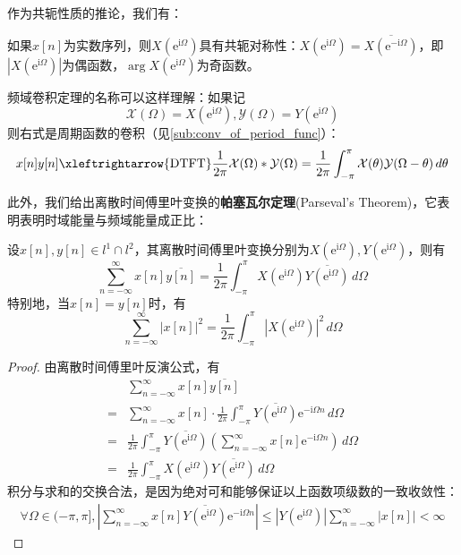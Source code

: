 作为共轭性质的推论，我们有：
\begin{corollary}
    如果$x[n]$为实数序列，则$X(\mathrm{e}^{\mathrm{i}\Omega})$具有共轭对称性：$X(\mathrm{e}^{\mathrm{i}\Omega})=\overline{X\left(\mathrm{e}^{-\mathrm{i}\Omega}\right)}$，即$|X(\mathrm{e}^{\mathrm{i}\Omega})|$为偶函数，$\arg X(\mathrm{e}^{\mathrm{i}\Omega})$为奇函数。
\end{corollary}

频域卷积定理的名称可以这样理解：如果记
$$\mathcal{X} (\Omega)=X(\mathrm{e}^{\mathrm{i}\Omega}),\mathcal{Y} (\Omega)=Y(\mathrm{e}^{\mathrm{i}\Omega})$$
则右式是周期函数的卷积（见\ref{sub:conv_of_period_func}）：
\[x[n]y[n]\xleftrightarrow{\text{DTFT}}\frac{1}{2\pi}\mathcal{X} (\Omega)*\mathcal{Y} (\Omega)=\frac{1}{2\pi}\int_{-\pi}^{\pi}\mathcal{X} (\theta)\mathcal{Y} (\Omega-\theta)\,d\theta\]

此外，我们给出离散时间傅里叶变换的\textbf{帕塞瓦尔定理}(Parseval's Theorem)，它表明表明时域能量与频域能量成正比：
\begin{theorem}[离散时间傅里叶变换的帕塞瓦尔定理]
    设$x[n],y[n]\in l^1\cap l^2$，其离散时间傅里叶变换分别为$X(\mathrm{e}^{\mathrm{i}\Omega}),Y(\mathrm{e}^{\mathrm{i}\Omega})$，则有
    \[\sum_{n=-\infty}^{\infty}x[n]\overline{y[n]}=\frac{1}{2\pi}\int_{-\pi}^{\pi}X(\mathrm{e}^{\mathrm{i}\Omega})\overline{Y(\mathrm{e}^{\mathrm{i}\Omega})}\,d\Omega\]
    特别地，当$x[n]=y[n]$时，有
    \[\sum_{n=-\infty}^{\infty}|x[n]|^2=\frac{1}{2\pi}\int_{-\pi}^{\pi}|X(\mathrm{e}^{\mathrm{i}\Omega})|^2\,d\Omega\]
\end{theorem}
\begin{proof}
    由离散时间傅里叶反演公式，有
    \begin{align*}
        &\sum_{n=-\infty}^{\infty}x[n]\overline{y[n]}\\
        =&\sum_{n=-\infty}^{\infty}x[n]\cdot\frac{1}{2\pi}\int_{-\pi}^{\pi}\overline{Y(\mathrm{e}^{\mathrm{i}\Omega})}\mathrm{e}^{-\mathrm{i}\Omega n}\,d\Omega\\
        =&\frac{1}{2\pi}\int_{-\pi}^{\pi}\overline{Y(\mathrm{e}^{\mathrm{i}\Omega})}\left(\sum_{n=-\infty}^{\infty}x[n]\mathrm{e}^{-\mathrm{i}\Omega n}\right)\,d\Omega\\
        =&\frac{1}{2\pi}\int_{-\pi}^{\pi}X(\mathrm{e}^{\mathrm{i}\Omega})\overline{Y(\mathrm{e}^{\mathrm{i}\Omega})}\,d\Omega
    \end{align*}
    积分与求和的交换合法，是因为绝对可和能够保证以上函数项级数的一致收敛性：\begin{align*}
    \forall\Omega\in(-\pi,\pi],\left|\sum_{n=-\infty}^{\infty}x[n]\overline{Y(\mathrm{e}^{\mathrm{i}\Omega})}\mathrm{e}^{-\mathrm{i}\Omega n}\right|\leq\left|Y(\mathrm{e}^{\mathrm{i}\Omega})\right|\sum_{n=-\infty}^{\infty}|x[n]|<\infty
    \end{align*}
\end{proof}

